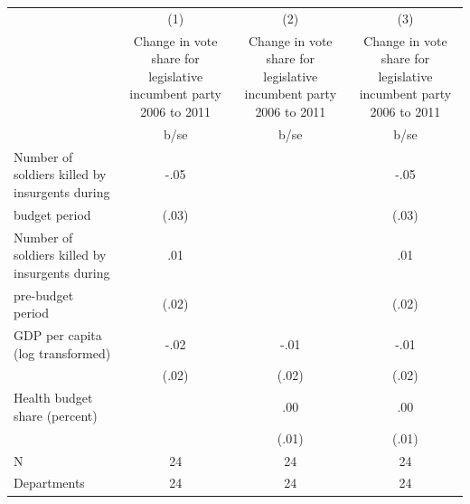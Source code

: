 {
\def\sym#1{\ifmmode^{#1}\else\(^{#1}\)\fi}
\begin{tabular}{l*{3}{c}}
\hline\hline
                                                  &\multicolumn{1}{c}{(1)}&\multicolumn{1}{c}{(2)}&\multicolumn{1}{c}{(3)}\\
                                                  &\multicolumn{1}{c}{Change in vote share for legislative incumbent party 2006 to 2011}&\multicolumn{1}{c}{Change in vote share for legislative incumbent party 2006 to 2011}&\multicolumn{1}{c}{Change in vote share for legislative incumbent party 2006 to 2011}\\
                                                  &        b/se   &        b/se   &        b/se   \\
\hline
Number of soldiers killed by insurgents during    &        -.05   &               &        -.05   \\
budget period                                     &       (.03)   &               &       (.03)   \\
Number of soldiers killed by insurgents during    &         .01   &               &         .01   \\
pre-budget period                                 &       (.02)   &               &       (.02)   \\
GDP per capita (log transformed)                  &        -.02   &        -.01   &        -.01   \\
                                                  &       (.02)   &       (.02)   &       (.02)   \\
Health budget share (percent)                     &               &         .00   &         .00   \\
                                                  &               &       (.01)   &       (.01)   \\
\hline
N                                                 &          24   &          24   &          24   \\
Departments                                       &          24   &          24   &          24   \\
\hline\hline
\end{tabular}
}
